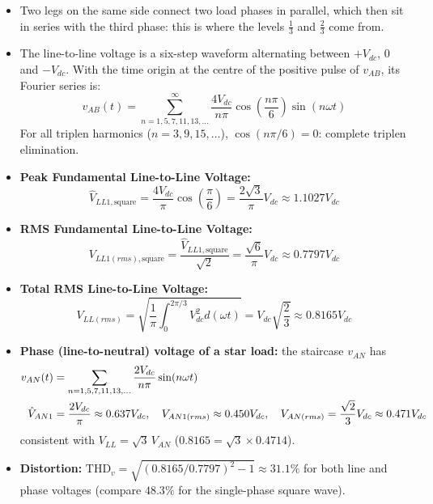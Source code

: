 \documentclass[11pt,a4paper]{article}
\begin{document}
\begin{itemize}[leftmargin=*]
  \item Two legs on the same side connect two load phases in parallel, which then sit in series with the third phase: this is where the levels $\frac{1}{3}$ and $\frac{2}{3}$ come from.
  \item The line-to-line voltage is a six-step waveform alternating between $+V_{dc}$, $0$ and $-V_{dc}$. With the time origin at the centre of the positive pulse of $v_{AB}$, its Fourier series is:
  \begin{equation}
  v_{AB}(t) = \sum_{n=1,5,7,11,13,\dots}^{\infty} \frac{4V_{dc}}{n\pi} \cos\left(\frac{n\pi}{6}\right) \sin(n\omega t)
  \end{equation}
  For all triplen harmonics ($n = 3, 9, 15, \dots$), $\cos(n\pi/6) = 0$: complete triplen elimination.
  \item \textbf{Peak Fundamental Line-to-Line Voltage:}
  \begin{equation}
  \hat{V}_{LL1,\text{square}} = \frac{4V_{dc}}{\pi} \cos\left(\frac{\pi}{6}\right) = \frac{2\sqrt{3}}{\pi}V_{dc} \approx 1.1027 V_{dc}
  \end{equation}
  \item \textbf{RMS Fundamental Line-to-Line Voltage:}
  \begin{equation}
  V_{LL1(rms),\text{square}} = \frac{\hat{V}_{LL1,\text{square}}}{\sqrt{2}} = \frac{\sqrt{6}}{\pi}V_{dc} \approx 0.7797 V_{dc}
  \end{equation}
  \item \textbf{Total RMS Line-to-Line Voltage:}
  \begin{equation}
  V_{LL(rms)} = \sqrt{\frac{1}{\pi} \int_0^{2\pi/3} V_{dc}^2 d(\omega t)} = V_{dc}\sqrt{\frac{2}{3}} \approx 0.8165 V_{dc}
  \end{equation}
  \item \textbf{Phase (line-to-neutral) voltage of a star load:} the staircase $v_{AN}$ has
  \begin{align}
  v_{AN}(t) &= \sum_{n=1,5,7,11,13,\dots}\frac{2V_{dc}}{n\pi}\sin(n\omega t) \notag\\
  \hat{V}_{AN1} &= \frac{2V_{dc}}{\pi} \approx 0.637V_{dc},\quad V_{AN1(rms)} \approx 0.450V_{dc},\quad V_{AN(rms)} = \frac{\sqrt{2}}{3}V_{dc} \approx 0.471V_{dc} \notag
  \end{align}
  consistent with $V_{LL} = \sqrt{3}\,V_{AN}$ ($0.8165 = \sqrt{3}\times 0.4714$).
  \item \textbf{Distortion:} $\text{THD}_v = \sqrt{(0.8165/0.7797)^2 - 1} \approx 31.1\%$ for both line and phase voltages (compare $48.3\%$ for the single-phase square wave).
\end{itemize}
\end{document}
